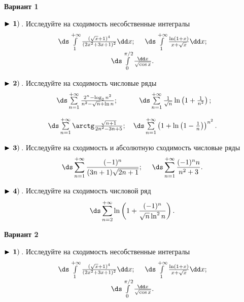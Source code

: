 
\centerline{\bf\Large Вариант 1}


$\bf\blacktriangleright\,1)\,$. Исследуйте на сходимость несобственные интегралы
\begin{equation*}
\begin{array}{cc}
  \,\ds\int\limits_{1}^{+\infty} \frac{(\sqrt{x}+1)^4}{(2x^2+3x+1)^2}\dd x
  ;\quad\,    \,\ds\int\limits_{1}^{+\infty}\frac{\ln(1+x)}{x+\sqrt{x}}\dd x
  ;\\
  \,\ds\int\limits_{0}^{\pi/2}\frac{\dd x}{\sqrt{\cos x}}
  .
\end{array}
\end{equation*}


$\bf\blacktriangleright\,2)\,$. Исследуйте на сходимость числовые ряды
\begin{equation*}
    \begin{array}{ccc}
        \,\ds\sum\limits_{n=1}^{+\infty}\frac{2^n-\log_2 n^2}{n^2-\sqrt{n}+\ln n}
        ; &   \,\ds\sum\limits_{n=1}^{+\infty}\frac{1}{\sqrt{n}}\ln\left(1+\frac{1}{n^2}\right)
        ; \\[6mm]
        \,\ds\sum\limits_{n=1}^{+\infty}\arctg\frac{\sqrt{n+1}}{2n^2-3n+5}
        ; &    \,\ds\sum\limits_{n=1}^{+\infty}\left(1+\ln\left(1-\frac{1}{n}\right)\right)^{n^2}
        .
    \end{array}
\end{equation*}


$\bf\blacktriangleright\,3)\,$. Исследуйте на сходимость и абсолютную сходимость числовые ряды
\begin{equation*}
    \,\ds\sum\limits_{n=1}^{+\infty}\frac{(-1)^n}{(3n+1)\sqrt{2n+1}}
    ;\quad\,   \,\ds\sum\limits_{n=1}^{+\infty}\frac{(-1)^n n}{n^2+3}
    .
\end{equation*}


$\bf\blacktriangleright\,4)\,$. Исследуйте на сходимость числовой ряд
\begin{equation*}
    \,\ds\sum\limits_{n=2}^{+\infty}\ln\left(1+\frac{(-1)^n}{\sqrt{n}\ln^2 n}\right)
    .
\end{equation*}

\centerline{\bf\Large Вариант 2}


$\bf\blacktriangleright\,1)\,$. Исследуйте на сходимость несобственные интегралы
\begin{equation*}
\begin{array}{cc}
  \,\ds\int\limits_{1}^{+\infty} \frac{(\sqrt{x}+1)^4}{(2x^2+3x+1)^2}\dd x
  ;\quad\,    \,\ds\int\limits_{1}^{+\infty}\frac{\ln(1+x)}{x+\sqrt{x}}\dd x
  ;\\
  \,\ds\int\limits_{0}^{\pi/2}\frac{\dd x}{\sqrt{\cos x}}
  .
\end{array}
\end{equation*}


